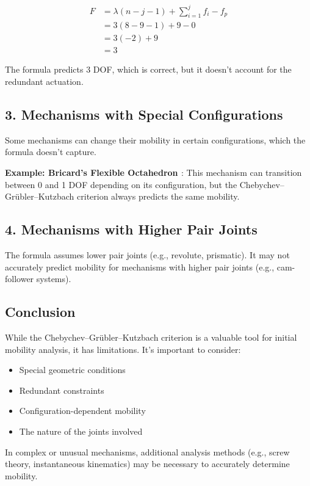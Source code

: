 \begin{solution}
    \begin{align*}
        F &= \lambda(n - j - 1) + \sum_{i=1}^j f_i - f_p \\
          &= 3(8 - 9 - 1) + 9 - 0 \\
          &= 3(-2) + 9 \\
          &= 3
    \end{align*}

    The formula predicts 3 DOF, which is correct, but it doesn't account for the redundant actuation.

    \subsection*{3. Mechanisms with Special Configurations}
    Some mechanisms can change their mobility in certain configurations, which the formula doesn't capture.

    \textbf{Example: Bricard's Flexible Octahedron \cite{baker1980analysis}} :
    This mechanism can transition between 0 and 1 DOF depending on its configuration, but the Chebychev–Grübler–Kutzbach criterion always predicts the same mobility.

    \subsection*{4. Mechanisms with Higher Pair Joints}
    The formula assumes lower pair joints (e.g., revolute, prismatic). It may not accurately predict mobility for mechanisms with higher pair joints (e.g., cam-follower systems).

    \subsection*{Conclusion}
    While the Chebychev–Grübler–Kutzbach criterion is a valuable tool for initial mobility analysis, it has limitations. It's important to consider:

    \begin{itemize}
        \item Special geometric conditions
        \item Redundant constraints
        \item Configuration-dependent mobility
        \item The nature of the joints involved
    \end{itemize}

    In complex or unusual mechanisms, additional analysis methods (e.g., screw theory, instantaneous kinematics) may be necessary to accurately determine mobility.
\end{solution}

